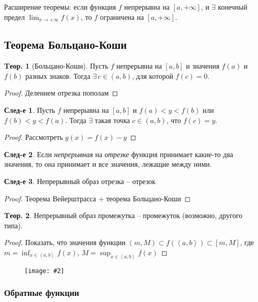 \documentclass[a4paper,12pt]{article}
\numberwithin{figure}{section}
\theoremstyle{definition}
\theoremstyle{definition}
\newtheorem{theorem}{Tеор.}[section]
\newtheorem*{corollary}{След-е} %
\def\DS{\displaystyle}
\def\intab{\left<a,b\right>}
\newcommand\CenterFigure[2]{
	\begin{figure}[H]
		\centering
		\texttt{[image: \#2]}
	\end{figure}
}
\begin{document}
Расширение теоремы: если функция $f$ непрерывна на $[a,+\infty]$,
и $\exists$ конечный предел $\DS \lim_{x\to+\infty}f(x)$,
то $f$ ограничена на $[a,+\infty]$.


\subsection{Теорема Больцано-Коши}

\begin{theorem}[Больцано-Коши]
	Пусть $f$ непрерывна на $[a,b]$ и значения $f(a)$ и $f(b)$ разных знаков.
	Тогда $\exists \, c \in (a,b)$, для которой $f(c)=0$.
\end{theorem}
\begin{proof} Делением отрезка пополам \end{proof}

\begin{corollary}
	Пусть $f$ непрерывна на $[a,b]$ и $f(a)<y<f(b)$ или $f(b)<y<f(a)$.
	Тогда $\exists$ такая точка $c\in(a,b)$, что $f(c)=y$.
\end{corollary}
\begin{proof} Рассмотреть $g(x)=f(x)-y$ \end{proof}

\begin{corollary}
	Если \textit{непрерывная} на \textit{отрезке} функция принимает какие-то два значения,
	то она принимает и все значения, лежащие между ними.
\end{corollary}
\bigskip

\begin{corollary}Непрерывный образ отрезка -- отрезок\end{corollary}
\begin{proof} Теорема Вейерштрасса + теорема Больцано-Коши \end{proof}
\bigskip

\begin{theorem}
	Непрерывный образ промежутка -- промежуток (возможно, другого типа).
\end{theorem}
\begin{proof}
	Показать, что значения функции $(m,M) \subset f\left(\intab\right) \subset [m,M]$,
	где $\DS m=\inf_{x\in\intab}f(x)$, $\DS M=\sup_{x\in\intab}f(x)$
\end{proof}
\bigskip

\CenterFigure{\linewidth}{bolcano-koshi-test-1.png}

\subsubsection{Обратные функции}
\end{document}
